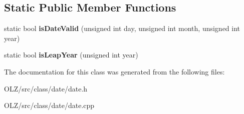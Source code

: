 \subsection*{Static Public Member Functions}
\begin{DoxyCompactItemize}
\item 
\hypertarget{class_date_ad99ae04c84eceaf1374d9f6617ad07cd}{}static bool {\bfseries is\+Date\+Valid} (unsigned int day, unsigned int month, unsigned int year)\label{class_date_ad99ae04c84eceaf1374d9f6617ad07cd}

\item 
\hypertarget{class_date_a11e14d85e1039e5a7fab1444a57cf15b}{}static bool {\bfseries is\+Leap\+Year} (unsigned int year)\label{class_date_a11e14d85e1039e5a7fab1444a57cf15b}

\end{DoxyCompactItemize}


The documentation for this class was generated from the following files\+:\begin{DoxyCompactItemize}
\item 
O\+L\+Z/src/class/date/date.\+h\item 
O\+L\+Z/src/class/date/date.\+cpp\end{DoxyCompactItemize}
